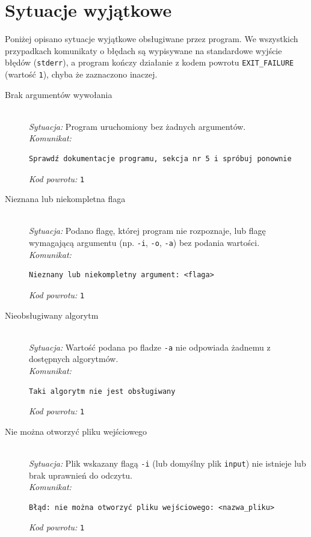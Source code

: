 \documentclass[12pt]{article}
\begin{document}
\section{Sytuacje wyjątkowe}
\label{sec:wyjatki}

Poniżej opisano sytuacje wyjątkowe obsługiwane przez program. We wszystkich
przypadkach komunikaty o błędach są wypisywane na standardowe wyjście błędów
(\texttt{stderr}), a program kończy działanie z kodem powrotu
\texttt{EXIT\_FAILURE} (wartość \texttt{1}), chyba że zaznaczono inaczej.

\begin{description}

	\item[Brak argumentów wywołania]
	      \hfill \\
	      \textit{Sytuacja:} Program uruchomiony bez żadnych argumentów. \\
	      \textit{Komunikat:}
	      \begin{verbatim}
Sprawdź dokumentacje programu, sekcja nr 5 i spróbuj ponownie
    \end{verbatim}
	      \textit{Kod powrotu:} \texttt{1}

	\item[Nieznana lub niekompletna flaga]
	      \hfill \\
	      \textit{Sytuacja:} Podano flagę, której program nie rozpoznaje, lub flagę
	      wymagającą argumentu (np. \texttt{-i}, \texttt{-o}, \texttt{-a}) bez
	      podania wartości. \\
	      \textit{Komunikat:}
	      \begin{verbatim}
Nieznany lub niekompletny argument: <flaga>
    \end{verbatim}
	      \textit{Kod powrotu:} \texttt{1}

	\item[Nieobsługiwany algorytm]
	      \hfill \\
	      \textit{Sytuacja:} Wartość podana po fladze \texttt{-a} nie odpowiada
	      żadnemu z dostępnych algorytmów. \\
	      \textit{Komunikat:}
	      \begin{verbatim}
Taki algorytm nie jest obsługiwany
    \end{verbatim}
	      \textit{Kod powrotu:} \texttt{1}

	\item[Nie można otworzyć pliku wejściowego]
	      \hfill \\
	      \textit{Sytuacja:} Plik wskazany flagą \texttt{-i} (lub domyślny plik
	      \texttt{input}) nie istnieje lub brak uprawnień do odczytu. \\
	      \textit{Komunikat:}
	      \begin{verbatim}
Błąd: nie można otworzyć pliku wejściowego: <nazwa_pliku>
    \end{verbatim}
	      \textit{Kod powrotu:} \texttt{1}


\end{description}
\end{document}
